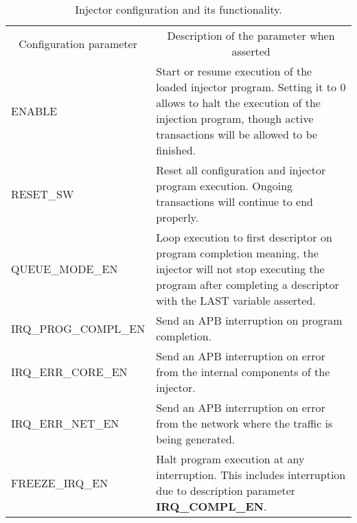 \begin{table}[h]
  \begin{tabular}{@{}p{0.2\linewidth}p{0.8\linewidth}@{}}
    \toprule
    \multicolumn{1}{c}{Configuration parameter} & \multicolumn{1}{c}{Description of the parameter when asserted}                                                                                                       \\
    \cmidrule{1-2}
      ENABLE                & Start or resume execution of the loaded injector program. Setting it to 0 allows to halt the execution of the injection program, though active transactions will be allowed to be finished. \\
      RESET\_SW             & Reset all configuration and injector program execution. Ongoing transactions will continue to end properly.                                                                                 \\
      QUEUE\_MODE\_EN       & Loop execution to first descriptor on program completion meaning, the injector will not stop executing the program after completing a descriptor with the LAST variable asserted.           \\
      IRQ\_PROG\_COMPL\_EN  & Send an APB interruption on program completion.                                                                                                                                             \\
      IRQ\_ERR\_CORE\_EN    & Send an APB interruption on error from the internal components of the injector.                                                                                                             \\
      IRQ\_ERR\_NET\_EN     & Send an APB interruption on error from the network where the traffic is being generated.                                                                                                    \\
      FREEZE\_IRQ\_EN       & Halt program execution at any interruption. This includes interruption due to description parameter \textbf{IRQ\_COMPL\_EN}.                                                                 \\
    \bottomrule
  \end{tabular}
\caption{Injector configuration and its functionality.}
\label{table:configuration}
\end{table}

